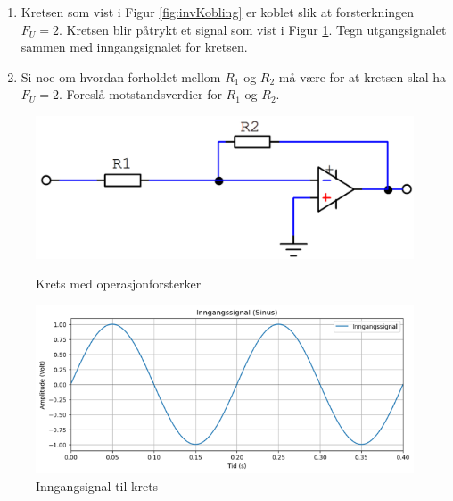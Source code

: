 \begin{question}[name=Oppgave, topic=operasjonsforsterker]
		\begin{enumerate}[label=\roman*)]
			\item Kretsen som vist i Figur \ref{fig:invKobling} er koblet slik at forsterkningen $F_U = 2$. Kretsen blir påtrykt et signal som vist i Figur \ref{fig:invPlot}. Tegn utgangsignalet sammen med inngangsignalet for kretsen.

			\item Si noe om hvordan forholdet mellom $R_1$ og $R_2$ må være for at kretsen skal ha $F_U = 2$. Foreslå motstandsverdier for $R_1$ og $R_2$.
		\end{enumerate}
	\begin{figure}[H]
	\begin{minipage}[c]{0.45\linewidth}
		\includegraphics[width=\linewidth]{operasjonsforsterker/figurer/invBasic.png}
		\caption{Krets med operasjonforsterker}
		\label{fig:invKobling}
	\end{minipage}
	\hfill
	\begin{minipage}[c]{0.45\linewidth}
		\includegraphics[width=\linewidth]{operasjonsforsterker/plot/InvPlot.png}
		\caption{Inngangsignal til krets}
		\label{fig:invPlot}
	\end{minipage}
\end{figure}

\end{question}

